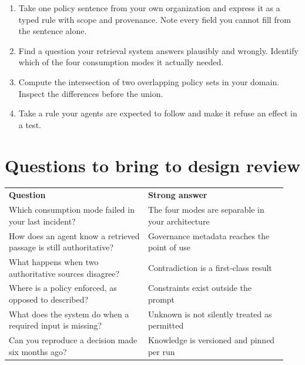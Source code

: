 \begin{enumerate}

\item Take one policy sentence from your own organization and express it as a typed rule with scope and provenance. Note every field you cannot fill from the sentence alone.

\item Find a question your retrieval system answers plausibly and wrongly. Identify which of the four consumption modes it actually needed.

\item Compute the intersection of two overlapping policy sets in your domain. Inspect the differences before the union.

\item Take a rule your agents are expected to follow and make it refuse an effect in a test.

\end{enumerate}

\section{Questions to bring to design review}

\BookTableStart
\small
\begin{tabular}{@{}Y{0.4700\linewidth}Y{0.4700\linewidth}@{}}
\color{white}\bfseries \textbf{Question} & \color{white}\bfseries \textbf{Strong answer} \\
Which consumption mode failed in your last incident? & The four modes are separable in your architecture \\
How does an agent know a retrieved passage is still authoritative? & Governance metadata reaches the point of use \\
What happens when two authoritative sources disagree? & Contradiction is a first-class result \\
Where is a policy enforced, as opposed to described? & Constraints exist outside the prompt \\
What does the system do when a required input is missing? & Unknown is not silently treated as permitted \\
Can you reproduce a decision made six months ago? & Knowledge is versioned and pinned per run \\
\end{tabular}
\BookTableEnd

